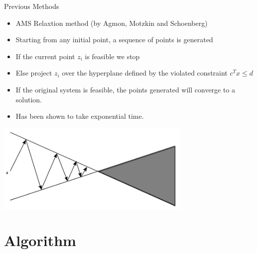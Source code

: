 \documentclass{beamer}
\begin{document}
\begin{frame}{Previous Methods}
\begin{itemize}
 \item AMS Relaxtion method (by Agmon, Motzkin and Schoenberg)
 \pause
 \item Starting from any initial point, a sequence of points is generated
 \pause
 \item If the current point $z_{i}$ is feasible we stop
 \pause
 \item Else project $z_{i}$ over the hyperplane defined by the violated constraint $c^{T}x \leq d$
 \pause
 \item If the original system is feasible, the points generated will converge to a solution.
 \pause
 \item Has been shown to take exponential time.
\end{itemize}

\pause

\includegraphics[width=0.7\textwidth]{fig/ams.png}

\end{frame}

\section{Algorithm}
% 
\end{document}
